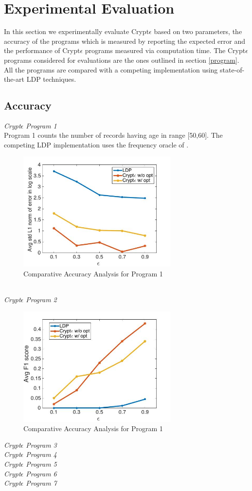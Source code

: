 \section{Experimental Evaluation}
In this section we experimentally evaluate  Crypt$\epsilon$  based on two parameters, the accuracy of the programs  which is measured  by reporting the expected error and the performance of Crypt$\epsilon$ programs measured via computation time. The Crypt$\epsilon$ programs considered for evaluations are the ones outlined in section \ref{program}. All the programs are compared with a competing implementation using state-of-the-art LDP techniques. 
\subsection{Accuracy}
\textit{Crypt$\epsilon$ Program 1}\\
Program 1 counts the number of records having age in range [50,60].  The competing LDP implementation uses the frequency oracle of \cite{LDP1}. 
\begin{figure}[h]
\includegraphics[width=8cm]{q1.jpg}
\caption{Comparative Accuracy Analysis for Program 1}
\end{figure}
\\\textit{Crypt$\epsilon$ Program 2}\\
\begin{figure}[h]
\includegraphics[width=8cm]{Q2.jpg}
\caption{Comparative Accuracy Analysis for Program 1}
\end{figure}
\textit{Crypt$\epsilon$ Program 3}\\
\textit{Crypt$\epsilon$ Program 4}\\
\textit{Crypt$\epsilon$ Program 5}\\
\textit{Crypt$\epsilon$ Program 6}\\
\textit{Crypt$\epsilon$ Program 7}\\

